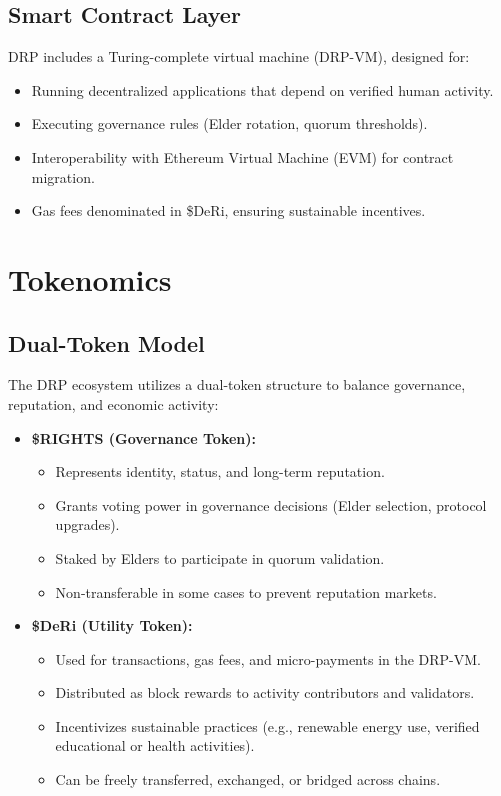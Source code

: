 \documentclass[11pt,a4paper]{article}
\begin{document}
\subsection{Smart Contract Layer}
DRP includes a Turing-complete virtual machine (DRP-VM), designed for:
\begin{itemize}
    \item Running decentralized applications that depend on verified human activity.
    \item Executing governance rules (Elder rotation, quorum thresholds).
    \item Interoperability with Ethereum Virtual Machine (EVM) for contract migration.
    \item Gas fees denominated in \$DeRi, ensuring sustainable incentives.
\end{itemize}

\section{Tokenomics}

\subsection{Dual-Token Model}
The DRP ecosystem utilizes a dual-token structure to balance governance, reputation, and economic activity:

\begin{itemize}
    \item \textbf{\$RIGHTS (Governance Token):}
    \begin{itemize}
        \item Represents identity, status, and long-term reputation.
        \item Grants voting power in governance decisions (Elder selection, protocol upgrades).
        \item Staked by Elders to participate in quorum validation.
        \item Non-transferable in some cases to prevent reputation markets.
    \end{itemize}

    \item \textbf{\$DeRi (Utility Token):}
    \begin{itemize}
        \item Used for transactions, gas fees, and micro-payments in the DRP-VM.
        \item Distributed as block rewards to activity contributors and validators.
        \item Incentivizes sustainable practices (e.g., renewable energy use, verified educational or health activities).
        \item Can be freely transferred, exchanged, or bridged across chains.
    \end{itemize}
\end{itemize}
\end{document}
